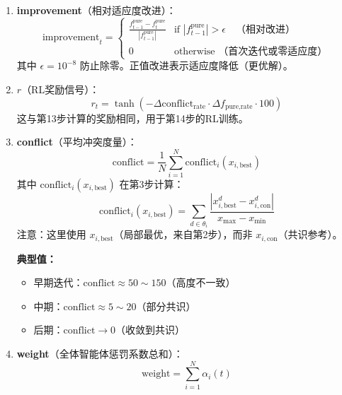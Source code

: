 \documentclass[11pt,a3paper]{ctexart}
\begin{document}
\begin{enumerate}
    \item \textbf{improvement}（相对适应度改进）：
    \begin{equation}
    \text{improvement}_t = \begin{cases}
    \frac{f_{t-1}^{\text{pure}} - f_t^{\text{pure}}}{|f_{t-1}^{\text{pure}}|} & \text{if } |f_{t-1}^{\text{pure}}| > \epsilon \quad \text{（相对改进）} \\
    0 & \text{otherwise （首次迭代或零适应度）}
    \end{cases}
    \end{equation}
    其中 $\epsilon = 10^{-8}$ 防止除零。正值改进表示适应度降低（更优解）。
    
    \item \textbf{$r$}（RL奖励信号）：
    \begin{equation}
    r_t = \tanh\!\left(-\Delta\text{conflict}_{\text{rate}} \cdot \Delta f_{\text{pure,rate}} \cdot 100\right)
    \end{equation}
    这与第13步计算的奖励相同，用于第14步的RL训练。
    
    \item \textbf{conflict}（平均冲突度量）：
    \begin{equation}
    \text{conflict} = \frac{1}{N}\sum_{i=1}^N \text{conflict}_i(x_{i,\text{best}})
    \end{equation}
    其中 $\text{conflict}_i(x_{i,\text{best}})$ 在第3步计算：
    \begin{equation}
    \text{conflict}_i(x_{i,\text{best}}) = \sum_{d \in \theta_i} \frac{|x_{i,\text{best}}^d - x_{i,\text{con}}^d|}{x_{\max} - x_{\min}}
    \end{equation}
    注意：这里使用 $x_{i,\text{best}}$（局部最优，来自第2步），而非 $x_{i,\text{con}}$（共识参考）。
    
    \textbf{典型值：}
    \begin{itemize}
        \item 早期迭代：$\text{conflict} \approx 50 \sim 150$（高度不一致）
        \item 中期：$\text{conflict} \approx 5 \sim 20$（部分共识）
        \item 后期：$\text{conflict} \to 0$（收敛到共识）
    \end{itemize}
    
    \item \textbf{weight}（全体智能体惩罚系数总和）：
    \begin{equation}
    \text{weight} = \sum_{i=1}^{N} \alpha_i(t)
    \end{equation}


\end{enumerate}
\end{document}
